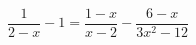 \begin{ex}[type=equation]
	\begin{condition}
		$\dfrac{1}{2 - x} - 1 = \dfrac{1 - x}{x - 2} - \dfrac{6 - x}{3 x^2 - 12}$
	\end{condition}
\end{ex}
